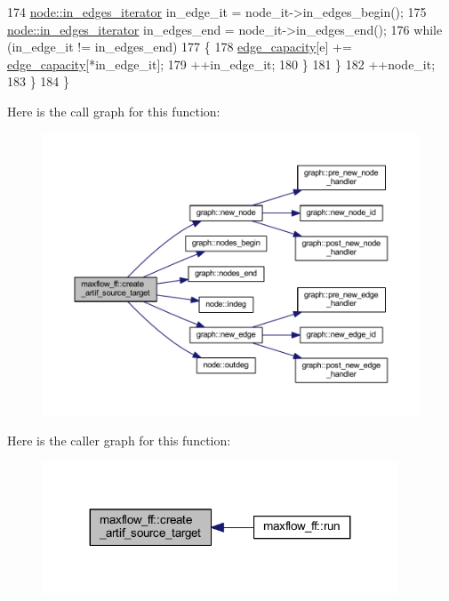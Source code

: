 \begin{DoxyCode}
174         \mbox{\hyperlink{classnode_a9a96be92add7c1a2771bcd0431ebf8ab}{node::in\_edges\_iterator}} in\_edge\_it = node\_it->in\_edges\_begin();
175         \mbox{\hyperlink{classnode_a9a96be92add7c1a2771bcd0431ebf8ab}{node::in\_edges\_iterator}} in\_edges\_end = node\_it->in\_edges\_end();
176         \textcolor{keywordflow}{while} (in\_edge\_it != in\_edges\_end)
177         \{
178         \mbox{\hyperlink{classmaxflow__ff_a5b38943e093c77a57eb70f1a4190b8a6}{edge\_capacity}}[e] += \mbox{\hyperlink{classmaxflow__ff_a5b38943e093c77a57eb70f1a4190b8a6}{edge\_capacity}}[*in\_edge\_it];
179         ++in\_edge\_it;
180         \}
181     \}
182     ++node\_it;
183     \}
184 \}
\end{DoxyCode}
Here is the call graph for this function\+:\nopagebreak
\begin{figure}[H]
\begin{center}
\leavevmode
\includegraphics[width=350pt]{classmaxflow__ff_ad2634e4325012773d793e9cf8f1a3dcf_cgraph}
\end{center}
\end{figure}
Here is the caller graph for this function\+:\nopagebreak
\begin{figure}[H]
\begin{center}
\leavevmode
\includegraphics[width=299pt]{classmaxflow__ff_ad2634e4325012773d793e9cf8f1a3dcf_icgraph}
\end{center}
\end{figure}
\mbox{\label{classmaxflow__ff_aea04831f46fb86990c9ba21fb19d0382}} 

